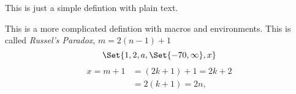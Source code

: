 \begin{SaveDefinition}[
    key=DefintionWithText,
    title={Definition With Only Text}
]
This is just a simple defintion with plain text.
\end{SaveDefinition}
\begin{SaveDefinition}[
    key=MoreComplicatedDefinition,
    title={Defintion With Macros, Environments etc.}
]
This is a more complicated defintion with macros and environments.
This is called \emph{Russel's Paradox},
$m=2(n-1)+1$
\[
	\Set{1,2,a,\Set{-70,\infty}, x}
\]
\begin{align*}
    x=m+1&=(2k+1)+1=2k+2\\
    &=2(k+1)=2n,
\end{align*}
\end{SaveDefinition}